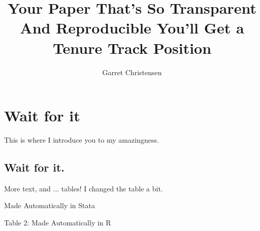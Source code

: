 \documentclass[11pt]{article} %
\title{Your Paper That's So Transparent And Reproducible You'll Get a Tenure Track Position}
\author{Garret Christensen}
\begin{document}
\maketitle

\section{Wait for it}

This is where I introduce you to my amazingness.

\subsection{Wait for it.}

More text, and ... tables! I changed the table a bit.

\begin{table}
\caption{Made Automatically in Stata}

\end{table}


 Table 2: Made Automatically in R
 
\end{document}

